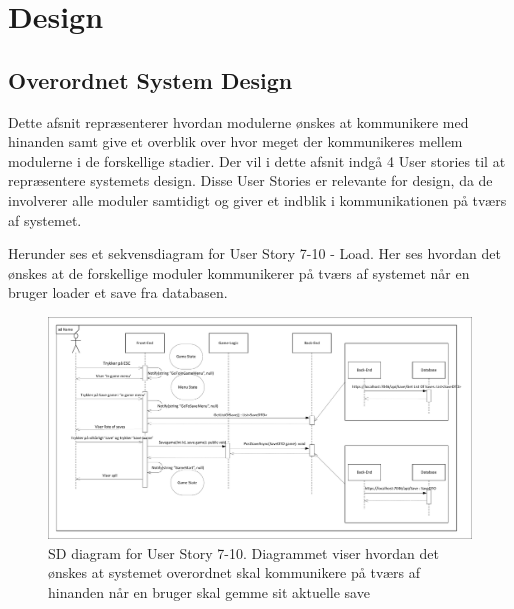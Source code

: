 \section{Design}

\subsection{Overordnet System Design}
\noindent Dette afsnit repræsenterer hvordan modulerne ønskes at kommunikere med hinanden samt give et overblik over hvor meget der kommunikeres mellem modulerne i de forskellige stadier. Der vil i dette afsnit indgå 4 User stories til at repræsentere systemets design. Disse User Stories er relevante for design, da de involverer alle moduler samtidigt og giver et indblik i kommunikationen på tværs af systemet.

\noindent Herunder ses et sekvensdiagram for User Story 7-10 - Load. Her ses hvordan det ønskes at de forskellige moduler kommunikerer på tværs af systemet når en bruger loader et save fra databasen.
\begin{figure}[H]
\centering
\includegraphics[width = \textwidth]{02-Body/Images/Arkitektur - SD Save Game}
\caption{SD diagram for User Story 7-10. Diagrammet viser hvordan det ønskes at systemet overordnet skal kommunikere på tværs af hinanden når en bruger skal gemme sit aktuelle save}
\label{fig:Arkitektur-SD-SaveGame}
\end{figure}

